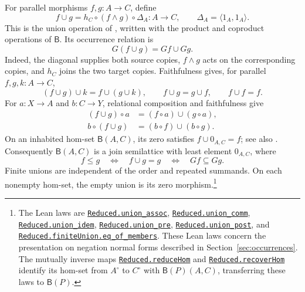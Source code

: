 \documentclass[11pt]{article}
\newcommand{\B}{\mathsf B}
\begin{document}
For parallel morphisms $f,g:A\to C$, define
\[
 f\cup g=h_C\circ(f\wedge g)\circ\Delta_A:A\longrightarrow C,
 \qquad \Delta_A=\langle1_A,1_A\rangle.
\]
This is the union operation of \cite[p.~220]{DP}, written with
the product and coproduct operations of $\B$. Its occurrence
relation is
\[
 G(f\cup g)=Gf\cup Gg.
\]
Indeed, the diagonal supplies both source copies, $f\wedge g$
acts on the corresponding copies, and $h_C$ joins the two target
copies. Faithfulness gives, for parallel $f,g,k:A\to C$,
\[
 (f\cup g)\cup k=f\cup(g\cup k),\qquad
 f\cup g=g\cup f,\qquad f\cup f=f.
\]
For $a:X\to A$ and $b:C\to Y$, relational composition and
faithfulness give
\[
 \begin{aligned}
 (f\cup g)\circ a&=(f\circ a)\cup(g\circ a),\\
 b\circ(f\cup g)&=(b\circ f)\cup(b\circ g).
 \end{aligned}
\]
On an inhabited hom-set $\B(A,C)$, its zero satisfies
$f\cup0_{A,C}=f$; see also \cite[pp.~290--291]{DP}.
Consequently $\B(A,C)$ is a join semilattice with least element
$0_{A,C}$, where
\[
 f\leq g\quad\Longleftrightarrow\quad f\cup g=g
 \quad\Longleftrightarrow\quad Gf\subseteq Gg.
\]
Finite unions are independent of the order and repeated
summands. On each nonempty hom-set, the empty union is its zero morphism.\footnote{\raggedright The Lean laws are
\href{https://github.com/flengyel/Dosen-Petric-Maximality/blob/dosen-petric-v25-palomar-v3/DosenPetric/ReducedUnion.lean\#L131}{\texttt{Reduced.\allowbreak{}union\_assoc}},
\href{https://github.com/flengyel/Dosen-Petric-Maximality/blob/dosen-petric-v25-palomar-v3/DosenPetric/ReducedUnion.lean\#L90}{\texttt{Reduced.\allowbreak{}union\_comm}},
\href{https://github.com/flengyel/Dosen-Petric-Maximality/blob/dosen-petric-v25-palomar-v3/DosenPetric/ReducedUnion.lean\#L97}{\texttt{Reduced.\allowbreak{}union\_idem}},
\href{https://github.com/flengyel/Dosen-Petric-Maximality/blob/dosen-petric-v25-palomar-v3/DosenPetric/ReducedUnion.lean\#L80}{\texttt{Reduced.\allowbreak{}union\_pre}},
\href{https://github.com/flengyel/Dosen-Petric-Maximality/blob/dosen-petric-v25-palomar-v3/DosenPetric/ReducedUnion.lean\#L85}{\texttt{Reduced.\allowbreak{}union\_post}}, and
\href{https://github.com/flengyel/Dosen-Petric-Maximality/blob/dosen-petric-v25-palomar-v3/DosenPetric/ReducedFiniteUnion.lean\#L57}{\texttt{Reduced.finiteUnion.\allowbreak{}eq\_of\_members}}.
These Lean laws concern the presentation on negation normal forms
described in Section~\ref{sec:occurrences}. The mutually inverse maps
\href{https://github.com/flengyel/Dosen-Petric-Maximality/blob/dosen-petric-v25-palomar-v3/DosenPetric/ReducedQuotientReduction.lean\#L21}{\texttt{Reduced.\allowbreak{}reduceHom}} and
\href{https://github.com/flengyel/Dosen-Petric-Maximality/blob/dosen-petric-v25-palomar-v3/DosenPetric/ReducedRecovery.lean\#L26}{\texttt{Reduced.\allowbreak{}recoverHom}} identify its hom-set from $A^\circ$ to $C^\circ$ with
$\B(P)(A,C)$, transferring these laws to $\B(P)$.}
\end{document}
